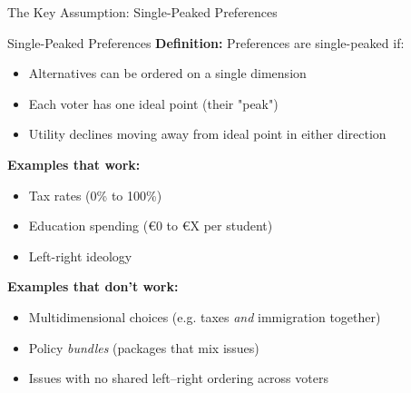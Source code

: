 \documentclass[10pt]{beamer}
\begin{document}
\begin{frame}{The Key Assumption: Single-Peaked Preferences}
\begin{block}{Single-Peaked Preferences}
\textbf{Definition:} Preferences are single-peaked if:
\begin{itemize}
\item Alternatives can be ordered on a single dimension
\item Each voter has one ideal point (their "peak")
\item Utility declines moving away from ideal point in either direction
\end{itemize}
\end{block}



\textbf{Examples that work:}
\begin{itemize}
\item Tax rates (0\% to 100\%)
\item Education spending (\euro 0 to \euro X per student)
\item Left-right ideology
\end{itemize}

 \textbf{Examples that don't work:}
\begin{itemize}
\item Multidimensional choices (e.g. taxes \emph{and} immigration together)
\item Policy \emph{bundles} (packages that mix issues)
\item Issues with no shared left--right ordering across voters
\end{itemize}

\end{frame}
\end{document}
